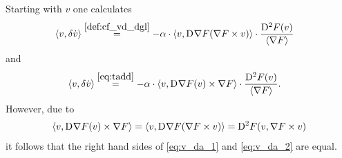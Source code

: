 Starting with $ v $ one calculates
\begin{align}
    \langle  v ,  \delta \dot{ v }  \rangle  &\overset{\eqref{def:cf_vd_dgl}}{=}
    -\alpha \cdot \langle  v ,  \mathrm{D}^{  }\nabla F( \nabla F \times v )  \rangle  \cdot
    \frac{ \mathrm{D}^{ 2 }F( v ) }{ \langle  \nabla F  \rangle }
    \label{eq:v_da_1}
\end{align}
and
\begin{align}
    \langle  v ,  \delta \dot{ v }  \rangle  &\overset{\eqref{eq:tadd}}{=}
    -\alpha \cdot \langle  v ,  \mathrm{D}^{  }\nabla F( v ) \times \nabla F  \rangle  \cdot
    \frac{ \mathrm{D}^{ 2 }F( v ) }{ \langle  \nabla F   \rangle } .
    \label{eq:v_da_2}
\end{align}
However, due to
\begin{align}
    \langle  v ,  \mathrm{D}^{  }\nabla F( v ) \times \nabla F  \rangle  =
    \langle  v ,  \mathrm{D}^{  }\nabla F( \nabla F \times v )  \rangle  =
    \mathrm{D}^{ 2 }F( v, \nabla F \times v )
\end{align}
it follows that the right hand sides
of \eqref{eq:v_da_1} and \eqref{eq:v_da_2} are equal.



